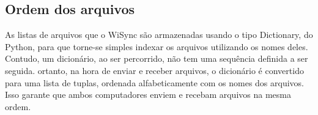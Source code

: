 \subsection{Ordem dos arquivos}
As listas de arquivos que o WiSync são armazenadas usando o tipo Dictionary, do Python, para que torne-se simples indexar os arquivos utilizando os nomes deles.
Contudo, um dicionário, ao ser percorrido, não tem uma sequência definida a ser seguida. 
ortanto, na hora de enviar e receber arquivos, o dicionário é convertido para uma lista de tuplas, ordenada alfabeticamente com os nomes dos arquivos.
Isso garante que ambos computadores enviem e recebam arquivos na mesma ordem.